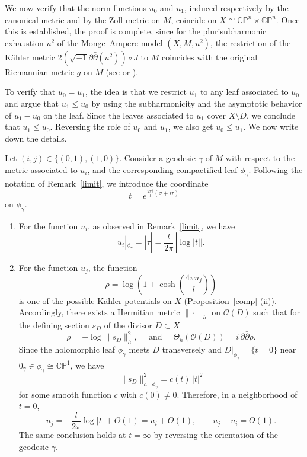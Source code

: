 \documentclass[a4paper, 12pt]{article}
\newcommand{\tCP}{\mathbb{CP}^n\times\mathbb{CP}^n}
\begin{document}
We now verify that the norm functions $u_0$ and $u_1$, induced respectively by the
canonical metric and by the Zoll metric on $M$, coincide on
$X \cong \tCP$.
Once this is established, the proof is complete, since for the plurisubharmonic
exhaustion $u^2$ of the Monge--Ampere model $(X,M,u^2)$,
the restriction of the K\"{a}hler metric $2 (\sqrt{-1}\partial\bar{\partial}(u^2))\circ J$ to $M$ coincides with
the original Riemannian metric $g$ on $M$ (see \cite[Section~3]{PW91} or \cite[(1.4)]{GS91}).

To verify that $u_0=u_1$, 
the idea is that we restrict $u_1$ to any leaf associated to $u_0$ and argue that $u_1\le u_0$ by using the subharmonicity and the asymptotic behavior of $u_1-u_0$ on the leaf. Since the leaves associated to $u_1$ cover $X\setminus D$, we conclude that $u_1\le u_0$. Reversing the role of $u_0$ and $u_1$, we also get $u_0\le u_1$. We now write down the details. 

Let $(i,j)\in\{(0,1),(1,0)\}$.
Consider a geodesic $\gamma$ of $M$ with respect to the metric associated to $u_i$,
and the corresponding compactified leaf $\phi_\gamma$.
Following the notation of Remark~\ref{limit}, we introduce the coordinate
\[
t = e^{\frac{2\pi i}{l}(\sigma+i\tau)}
\]
on $\phi_\gamma$.

\begin{enumerate}
\item
For the function $u_i$, as observed in Remark~\ref{limit}, we have
\[
u_i|_{\phi_\gamma} = |\tau|
= \frac{l}{2\pi}\,|\log|t||.
\]

\item
For the function $u_j$, the function
\[
\rho = \log\!\left(1+\cosh\!\left(\frac{4\pi u_j}{l}\right)\right)
\]
is one of the possible K\"ahler potentials on $X$ (Proposition~\ref{comp} (ii)).
Accordingly, there exists a Hermitian metric $\|\cdot\|_h$ on $\mathcal O(D)$ such that for the defining section $s_D$ of the divisor $D\subset X$ 
\[
\rho=-\log \|s_D\|_h^2, \quad 
\text{ and } \quad
\Theta_h(\mathcal O(D)) = i\,\partial\bar\partial \rho. 
\]
Since the holomorphic leaf $\phi_\gamma$ meets $D$ transversely and $D|_ {\phi_\gamma}=\{t=0\}$ near $0_\gamma\in \phi_\gamma\cong \mathbb{CP}^1$, we have
\[
\|s_D\|^2_h\big|_{\phi_\gamma} = c(t)\,|t|^2
\]
for some smooth function $c$ with $c(0)\neq 0$.
Therefore, in a neighborhood of $t=0$,
\[
u_j = -\frac{l}{2\pi}\log|t| + O(1)
= u_i + O(1),\qquad u_j-u_i=O(1). 
\]
The same conclusion holds at $t=\infty$ by reversing the orientation of the
geodesic $\gamma$.
\end{enumerate}
\end{document}
